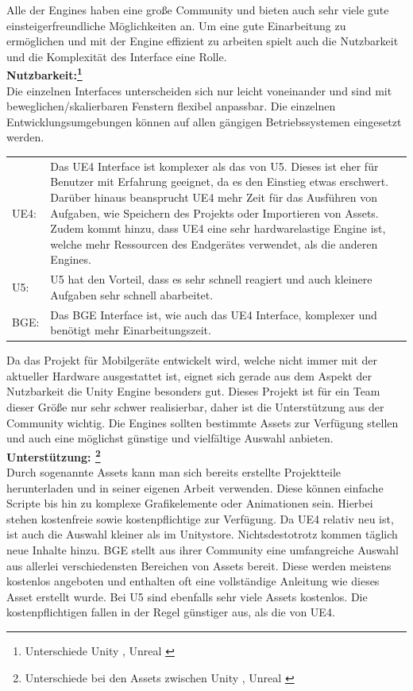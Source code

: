 Alle der Engines haben eine große Community und bieten auch sehr viele gute einsteigerfreundliche Möglichkeiten an. 
Um eine gute Einarbeitung zu ermöglichen und mit der Engine effizient zu arbeiten spielt auch die Nutzbarkeit und die Komplexität des Interface eine Rolle.\\

\textbf{Nutzbarkeit:\footnote{ Unterschiede Unity , Unreal \cite{unityhacker2015}}}\\
Die einzelnen Interfaces unterscheiden sich nur leicht voneinander und sind mit beweglichen/skalierbaren Fenstern flexibel anpassbar. Die einzelnen Entwicklungsumgebungen können auf allen gängigen Betriebssystemen eingesetzt werden.
\begin{table}[H]
\centering
\begin{tabular}{lp{14.5cm}}
\ac{UE4}:& 
Das \ac{UE4} Interface ist komplexer als das von \ac{U5}. Dieses ist eher für Benutzer mit Erfahrung geeignet, da es den Einstieg etwas erschwert. Darüber hinaus beansprucht \ac{UE4} mehr Zeit für das Ausführen von Aufgaben, wie Speichern des Projekts oder Importieren von Assets. Zudem kommt hinzu, dass \ac{UE4} eine sehr hardwarelastige Engine ist, welche mehr Ressourcen des Endgerätes verwendet, als die anderen Engines.\\
\ac{U5}:&
\ac{U5} hat den Vorteil, dass es sehr schnell reagiert und auch kleinere Aufgaben sehr schnell abarbeitet.\\  
\ac{BGE}:&
Das \ac{BGE} Interface ist, wie auch das \ac{UE4} Interface, komplexer und benötigt mehr Einarbeitungszeit.
\end{tabular}
\end{table}
Da das Projekt für Mobilgeräte entwickelt wird, welche nicht immer mit der aktueller Hardware ausgestattet ist, eignet sich gerade aus dem Aspekt der Nutzbarkeit die Unity Engine besonders gut.
Dieses Projekt ist für ein Team dieser Größe nur sehr schwer realisierbar, daher ist die Unterstützung aus der Community wichtig. Die Engines sollten bestimmte Assets zur Verfügung stellen und auch eine möglichst günstige und vielfältige Auswahl anbieten.\\

\textbf{Unterstützung: \footnote{Unterschiede bei den Assets zwischen Unity , Unreal \cite{unityhacker2015}}}\\
Durch sogenannte Assets kann man sich bereits erstellte Projektteile herunterladen und in seiner eigenen Arbeit verwenden. Diese können einfache Scripte bis hin zu komplexe Grafikelemente oder Animationen sein. Hierbei stehen kostenfreie sowie kostenpflichtige zur Verfügung. Da \ac{UE4} relativ neu ist, ist auch die Auswahl kleiner als im Unitystore. Nichtsdestotrotz kommen täglich neue Inhalte hinzu. \ac{BGE} stellt aus ihrer Community eine umfangreiche Auswahl aus allerlei verschiedensten Bereichen von Assets bereit. Diese werden meistens kostenlos angeboten und enthalten oft eine vollständige Anleitung wie dieses Asset erstellt wurde. Bei \ac{U5} sind ebenfalls sehr viele Assets kostenlos. Die kostenpflichtigen fallen in der Regel günstiger aus, als die von \ac{UE4}.

